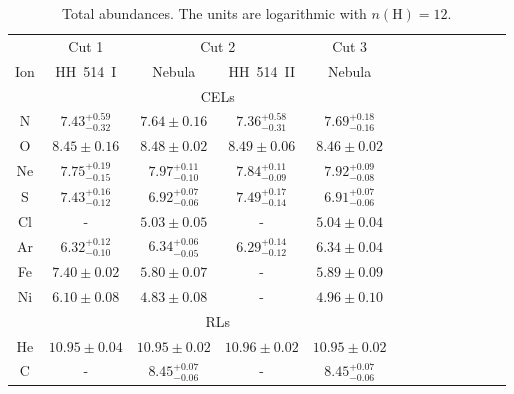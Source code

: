 \documentclass[fleqn,usenatbib]{mnras}
\begin{document}
\begin{table}
\centering
\caption{Total abundances. The units are logarithmic with $n(\text{H})=12$.}
\label{tab:total_abundances}
\begin{tabular}{ccccccccccccc}
\hline
 & \multicolumn{1}{c}{Cut 1} & \multicolumn{2}{c}{Cut 2} & \multicolumn{1}{c}{Cut 3} & \\
Ion &  HH~514~I & Nebula & HH~514~II  & Nebula \\
\hline
 & \multicolumn{4}{c}{CELs}\\

N  & $7.43 ^{+0.59} _{-0.32}$ & $7.64 \pm 0.16$ &$7.36 ^{+0.58} _{-0.31}$ & $7.69 ^{+0.18} _{-0.16}$ \\ 

O  & $8.45 \pm 0.16$ & $8.48 \pm 0.02$ &$8.49 \pm 0.06$&$8.46 \pm 0.02$\\

Ne & $7.75 ^{+0.19} _{-0.15}$ & $7.97 ^{+0.11} _{-0.10}$& $7.84 ^{+0.11} _{-0.09}$ & $7.92 ^{+0.09} _{-0.08}$ \\ 

S  & $7.43 ^{+0.16} _{-0.12}$ & $6.92 ^{+0.07} _{-0.06}$& $7.49 ^{+0.17} _{-0.14}$ &$6.91 ^{+0.07} _{-0.06}$\\

Cl & - & $5.03 \pm 0.05$&- &$5.04 \pm 0.04$\\

Ar & $6.32 ^{+0.12} _{-0.10}$ & $6.34 ^{+0.06} _{-0.05}$ & $6.29 ^{+0.14} _{-0.12}$& $6.34 \pm 0.04$\\

Fe & $7.40 \pm 0.02$ & $5.80 \pm 0.07$ & - &$5.89 \pm 0.09$\\


Ni & $6.10 \pm 0.08$ & $4.83 \pm 0.08 $&-&$4.96 \pm 0.10$\\

 & \multicolumn{4}{c}{RLs}\\

He  &$10.95 \pm 0.04$  & $10.95 \pm 0.02$ & $10.96 \pm 0.02$ & $10.95 \pm 0.02$\\

C & - &$8.45 ^{+0.07} _{-0.06}$&-&$8.45 ^{+0.07} _{-0.06}$\\ 


\end{tabular}
\end{table}
\end{document}
